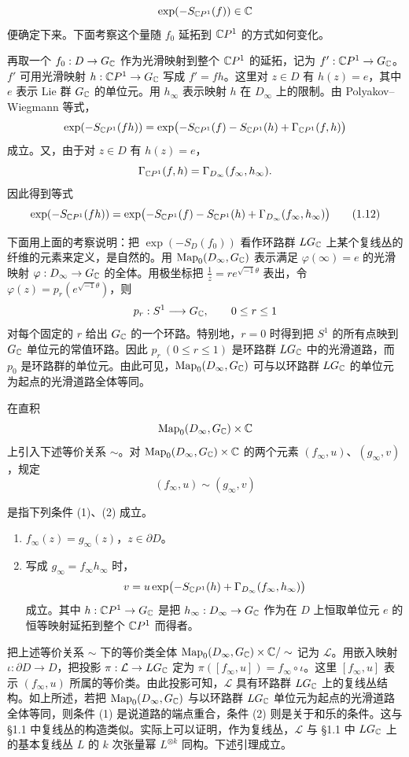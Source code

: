\[
  \exp(-S_{\mathbb{C}P^1}(f))\in\mathbb{C}
\]
便确定下来。下面考察这个量随 $f_0$ 延拓到 $\mathbb{C}P^1$ 的方式如何变化。

再取一个 $f_0:D\to G_{\mathbb{C}}$ 作为光滑映射到整个 $\mathbb{C}P^1$ 的延拓，记为 $f':\mathbb{C}P^1\to G_{\mathbb{C}}$。$f'$ 可用光滑映射 $h:\mathbb{C}P^1\to G_{\mathbb{C}}$ 写成 $f'=fh$。这里对 $z\in D$ 有 $h(z)=e$，其中 $e$ 表示 Lie 群 $G_{\mathbb{C}}$ 的单位元。用 $h_\infty$ 表示映射 $h$ 在 $D_\infty$ 上的限制。由 Polyakov--Wiegmann 等式，
\[
  \exp(-S_{\mathbb{C}P^1}(fh))=\exp\bigl(-S_{\mathbb{C}P^1}(f)-S_{\mathbb{C}P^1}(h)+\Gamma_{\mathbb{C}P^1}(f,h)\bigr)
\]
成立。又，由于对 $z\in D$ 有 $h(z)=e$，
\[
  \Gamma_{\mathbb{C}P^1}(f,h)=\Gamma_{D_\infty}(f_\infty,h_\infty).
\]
因此得到等式
\begin{equation}
  \exp(-S_{\mathbb{C}P^1}(fh))=\exp\bigl(-S_{\mathbb{C}P^1}(f)-S_{\mathbb{C}P^1}(h)+\Gamma_{D_\infty}(f_\infty,h_\infty)\bigr) \tag{1.12}
\end{equation}

下面用上面的考察说明：把 $\exp(-S_D(f_0))$ 看作环路群 $LG_{\mathbb{C}}$ 上某个复线丛的纤维的元素来定义，是自然的。用 $\operatorname{Map}_0(D_\infty,G_{\mathbb{C}})$ 表示满足 $\varphi(\infty)=e$ 的光滑映射 $\varphi:D_\infty\to G_{\mathbb{C}}$ 的全体。用极坐标把 $\frac{1}{z}=re^{\sqrt{-1}\theta}$ 表出，令 $\varphi(z)=p_r(e^{\sqrt{-1}\theta})$，则
\[
  p_r:S^1\longrightarrow G_{\mathbb{C}},\qquad 0\le r\le1
\]
对每个固定的 $r$ 给出 $G_{\mathbb{C}}$ 的一个环路。特别地，$r=0$ 时得到把 $S^1$ 的所有点映到 $G_{\mathbb{C}}$ 单位元的常值环路。因此 $p_r\ (0\le r\le1)$ 是环路群 $LG_{\mathbb{C}}$ 中的光滑道路，而 $p_0$ 是环路群的单位元。由此可见，$\operatorname{Map}_0(D_\infty,G_{\mathbb{C}})$ 可与以环路群 $LG_{\mathbb{C}}$ 的单位元为起点的光滑道路全体等同。

在直积
\[
  \operatorname{Map}_0(D_\infty,G_{\mathbb{C}})\times\mathbb{C}
\]
上引入下述等价关系 $\sim$。对 $\operatorname{Map}_0(D_\infty,G_{\mathbb{C}})\times\mathbb{C}$ 的两个元素 $(f_\infty,u)$、$(g_\infty,v)$，规定
\[
  (f_\infty,u)\sim(g_\infty,v)
\]

是指下列条件 (1)、(2) 成立。
\begin{enumerate}[label=(\arabic*),leftmargin=2.2em,itemsep=3pt]
  \item $f_\infty(z)=g_\infty(z)$，$z\in\partial D$。
  \item 写成 $g_\infty=f_\infty h_\infty$ 时，
  \[
    v=u\exp\bigl(-S_{\mathbb{C}P^1}(h)+\Gamma_{D_\infty}(f_\infty,h_\infty)\bigr)
  \]
  成立。其中 $h:\mathbb{C}P^1\to G_{\mathbb{C}}$ 是把 $h_\infty:D_\infty\to G_{\mathbb{C}}$ 作为在 $D$ 上恒取单位元 $e$ 的恒等映射延拓到整个 $\mathbb{C}P^1$ 而得者。
\end{enumerate}

把上述等价关系 $\sim$ 下的等价类全体 $\operatorname{Map}_0(D_\infty,G_{\mathbb{C}})\times\mathbb{C}/\sim$ 记为 $\mathcal{L}$。用嵌入映射 $\iota:\partial D\to D$，把投影 $\pi:\mathcal{L}\to LG_{\mathbb{C}}$ 定为 $\pi([f_\infty,u])=f_\infty\circ\iota$。这里 $[f_\infty,u]$ 表示 $(f_\infty,u)$ 所属的等价类。由此投影可知，$\mathcal{L}$ 具有环路群 $LG_{\mathbb{C}}$ 上的复线丛结构。如上所述，若把 $\operatorname{Map}_0(D_\infty,G_{\mathbb{C}})$ 与以环路群 $LG_{\mathbb{C}}$ 单位元为起点的光滑道路全体等同，则条件 (1) 是说道路的端点重合，条件 (2) 则是关于和乐的条件。这与 §1.1 中复线丛的构造类似。实际上可以证明，作为复线丛，$\mathcal{L}$ 与 §1.1 中 $LG_{\mathbb{C}}$ 上的基本复线丛 $L$ 的 $k$ 次张量幂 $L^{\otimes k}$ 同构。下述引理成立。

